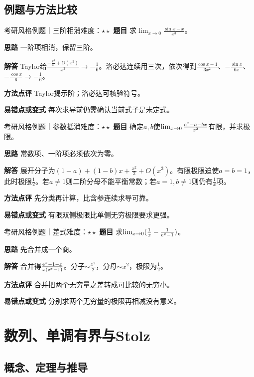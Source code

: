 \subsection{例题与方法比较}
\begin{example}{考研风格例题｜三阶相消}{难度：$\star\star$}
\label{ex:1:7}\textbf{题目} 求$\lim_{x\to0}\frac{\sin x-x}{x^3}$。\par
\textbf{思路} 一阶项相消，保留三阶。\par
\textbf{解答} Taylor给$\frac{-\frac{x^3}{6}+O(x^5)}{x^3}\to-\frac{1}{6}$。洛必达连续用三次，依次得到$\frac{\cos x-1}{3x^2}$、$-\frac{\sin x}{6x}$、$-\frac{\cos x}{6}\to-\frac{1}{6}$。\par
\textbf{方法点评} Taylor揭示阶；洛必达可核验符号。\par
\textbf{易错点或变式} 每次求导前仍需确认当前式子是未定式。
\end{example}
\begin{example}{考研风格例题｜参数抵消}{难度：$\star\star$}
\label{ex:1:8}\textbf{题目} 确定$a,b$使$\lim_{x\to0}\frac{\mathrm{e}^x-a-bx}{x^2}$有限，并求极限。\par
\textbf{思路} 常数项、一阶项必须依次为零。\par
\textbf{解答} 展开分子为$(1-a)+(1-b)x+\frac{x^2}{2}+O(x^3)$。有限极限迫使$a=b=1$，此时极限$\frac{1}{2}$。若$a\ne1$则二阶分母不能平衡常数；若$a=1,b\ne1$则仍有$\frac{1}{x}$项。\par
\textbf{方法点评} 先分类再计算，比含参连续求导可靠。\par
\textbf{易错点或变式} 有限双侧极限比单侧无穷极限要求更强。
\end{example}
\begin{example}{考研风格例题｜差式}{难度：$\star\star$}
\label{ex:1:9}\textbf{题目} 求$\lim_{x\to0}(\frac{1}{x}-\frac{1}{\mathrm{e}^x-1})$。\par
\textbf{思路} 先合并成一个商。\par
\textbf{解答} 合并得$\frac{\mathrm{e}^x-1-x}{x(\mathrm{e}^x-1)}$。分子$\sim \frac{x^2}{2}$，分母$\sim x^2$，极限为$\frac{1}{2}$。\par
\textbf{方法点评} 合并把两个无穷量之差转成可比较的无穷小。\par
\textbf{易错点或变式} 分别求两个无穷量的极限再相减没有意义。
\end{example}
\section{数列、单调有界与Stolz}\label{sec:1:4}
\subsection{概念、定理与推导}

